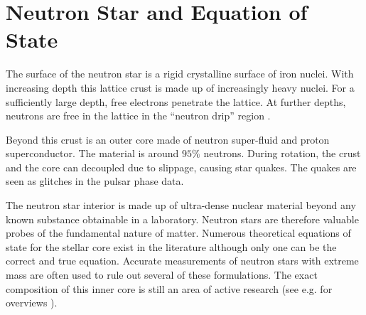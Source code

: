 \section{Neutron Star and Equation of State}
\label{sec:NSandEOS}
The surface of the neutron star is a rigid crystalline 
surface of iron nuclei.  With increasing depth this
lattice crust is made up of increasingly heavy nuclei.  
For a sufficiently large depth, free electrons 
penetrate the lattice.  At further depths, neutrons
are free in the lattice in the ``neutron drip'' region
\citep{kraus1986radio}.

Beyond this crust is an outer core made of 
neutron super-fluid and proton superconductor.
The material is around $95\%$ neutrons.
During rotation, the crust and the core 
can decoupled due to slippage, causing star quakes.
The quakes are seen as glitches in the pulsar phase data.

The neutron star interior is made up of ultra-dense nuclear material
beyond any known substance obtainable in a laboratory.  Neutron
stars are therefore valuable probes of the fundamental nature of 
matter.  Numerous theoretical equations of state for the stellar
core exist in the literature
although only one can be the correct and 
true equation.  Accurate measurements of neutron stars with 
extreme mass are often used to rule out several of these formulations.
The exact composition of this inner core is still
an area of active research (see e.g. for overviews \citealp{becker2009neutron}).
